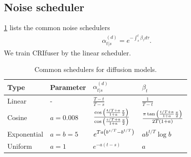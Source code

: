 \documentclass{article}
\begin{document}


\subsection{Noise scheduler}

\cref{tab:CommonScheduler} lists the common noise schedulers \cite{zhao2024unified}
\begin{eqnarray*}
\alpha^{(d)}_{t|s} = e^{-\int_s^t \beta_\tau d\tau}.
\end{eqnarray*}
We train CRIfuser by the linear scheduler.
\begin{table}[H]
  \begin{tabular}{|l|l|l|l|}
    \hline
    Type & Parameter & $\alpha^{(d)}_{t|s}$ & $\beta_t$ \\
    \hline
    Linear\cite{ho2020denoising} & - & $\frac{T - t}{T - s}$ & $\frac{1}{T - t}$ \\
    Cosine\cite{hoogeboom2021argmax} & $a = 0.008$ & $\frac{\cos\qty(\frac{t/T+a}{1+a}\frac{\pi}{2})}{\cos\qty(\frac{s/T + a}{1+a}\frac{\pi}{2})}$ & $\frac{\pi\tan\qty(\frac{t/T + a}{1 + a}\frac{\pi}{2})}{2T(1+a)}$ \\
    Exponential\cite{campbell2022continuous} & $a=b=5$ & $e^{Ta\qty(b^{s/T} - b^{t/T})}$ & $ab^{t/T}\log b$ \\
    Uniform & $a=1$ & $e^{-a(t - s)}$ & $a$ \\
    \hline
  \end{tabular}
  \caption{Common schedulers for diffusion models.}\label{tab:CommonScheduler}
\end{table}
\end{document}
